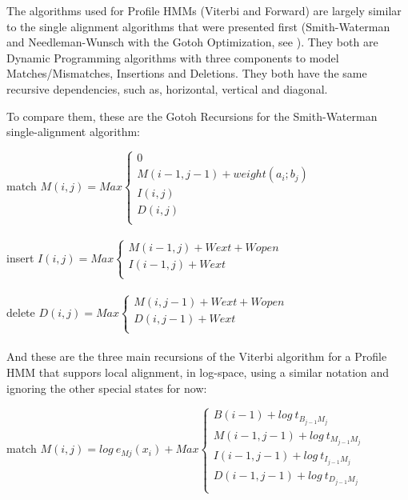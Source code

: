 The algorithms used for Profile HMMs (Viterbi and Forward) are largely similar to the single alignment algorithms that were presented first (Smith-Waterman and Needleman-Wunsch with the Gotoh Optimization, see ). They both are Dynamic Programming algorithms with three components to model Matches/Mismatches, Insertions and Deletions. They both have the same recursive dependencies, such as, horizontal, vertical and diagonal.

To compare them, these are the Gotoh Recursions for the Smith-Waterman single-alignment algorithm:

match   $ M(i,j) = Max \begin{cases} 
						0 		\\
						M(i-1,j-1) + weight(a_i; b_j)	\\
						I(i,j)	\\
						D(i,j)	\\
						\end{cases} $ \\
\\

insert $ I(i,j) = Max \begin{cases} 
						M(i-1,j) + Wext + Wopen \\
						I(i-1,j) + Wext		\\
						\end{cases} $ \\
\\

delete $ D(i,j) = Max  \begin{cases} 
						M(i,j-1) + Wext + Wopen \\
						D(i,j-1) + Wext 	\\
						\end{cases} $ \\
\\
And these are the three main recursions of the Viterbi algorithm for a Profile HMM that suppors local alignment, in log-space, using a similar notation and ignoring the other special states for now:

match	$ M(i,j) = log\ {e_{Mj}(x_i)} + Max  
				\begin{cases}
					B(i-1)     + log\ t_{B_{j-1} M_j} \\
					M(i-1,j-1) + log\ t_{M_{j-1} M_j} \\
					I(i-1,j-1) + log\ t_{I_{j-1} M_j} \\
					D(i-1,j-1) + log\ t_{D_{j-1} M_j} \\
				\end{cases} $ \\
\\

